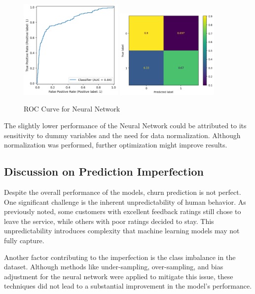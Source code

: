 \documentclass[12pt]{article}
\begin{document}
\begin{figure}[h!]
    \centering
    \includegraphics[width=0.45\textwidth]{figures/roc_curve_nn.png}
    \includegraphics[width=0.45\textwidth]{figures/confusion_matrix_nn.png}
    \caption{ROC Curve for Neural Network}
    \label{fig:roc_curve_nn}
\end{figure}

The slightly lower performance of the Neural Network could be attributed to its sensitivity to dummy variables and the need for data normalization. Although normalization was performed, further optimization might improve results.

\subsection{Discussion on Prediction Imperfection}

Despite the overall performance of the models, churn prediction is not perfect. One significant challenge is the inherent unpredictability of human behavior. As previously noted, some customers with excellent feedback ratings still chose to leave the service, while others with poor ratings decided to stay. This unpredictability introduces complexity that machine learning models may not fully capture.

Another factor contributing to the imperfection is the class imbalance in the dataset. Although methods like under-sampling, over-sampling, and bias adjustment for the neural network were applied to mitigate this issue, these techniques did not lead to a substantial improvement in the model's performance. 
\end{document}
